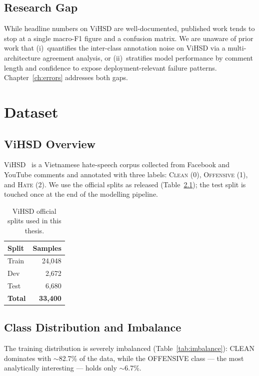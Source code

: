 \documentclass[a4paper,12pt,oneside]{report}
\begin{document}
\section{Research Gap}
While headline numbers on ViHSD are well-documented, published work tends
to stop at a single macro-F1 figure and a confusion matrix. We are unaware
of prior work that
(i)~quantifies the inter-class annotation noise on ViHSD via a multi-architecture
agreement analysis, or
(ii)~stratifies model performance by comment length and confidence to
expose deployment-relevant failure patterns. Chapter~\ref{ch:errors}
addresses both gaps.


\chapter{Dataset}
\label{ch:dataset}

\section{ViHSD Overview}
ViHSD~\cite{luu2021vihsd} is a Vietnamese hate-speech corpus collected
from Facebook and YouTube comments and annotated with three labels:
\textsc{Clean} (0), \textsc{Offensive} (1), and \textsc{Hate} (2). We use
the official splits as released (Table~\ref{tab:splits}); the test split
is touched once at the end of the modelling pipeline.

\begin{table}[H]
\centering
\caption{ViHSD official splits used in this thesis.}
\label{tab:splits}
\begin{tabular}{lr}
\toprule
Split & Samples \\ \midrule
Train & 24{,}048 \\
Dev   &  2{,}672 \\
Test  &  6{,}680 \\ \midrule
\textbf{Total} & \textbf{33{,}400} \\ \bottomrule
\end{tabular}
\end{table}

\section{Class Distribution and Imbalance}
\label{sec:imbalance}
The training distribution is severely imbalanced
(Table~\ref{tab:imbalance}): CLEAN dominates with $\sim$82.7\% of the
data, while the OFFENSIVE class --- the most analytically interesting ---
holds only $\sim$6.7\%.
\end{document}
